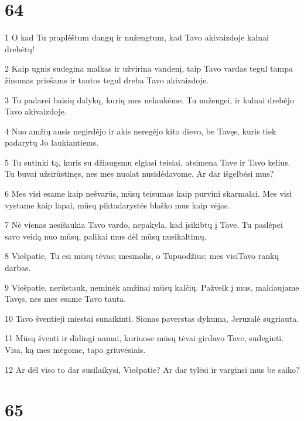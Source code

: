\chapter{64}


\par 1 O kad Tu praplėštum dangų ir nužengtum, kad Tavo akivaizdoje kalnai drebėtų! 
\par 2 Kaip ugnis sudegina malkas ir užvirina vandenį, taip Tavo vardas tegul tampa žinomas priešams ir tautos tegul dreba Tavo akivaizdoje. 
\par 3 Tu padarei baisių dalykų, kurių mes nelaukėme. Tu nužengei, ir kalnai drebėjo Tavo akivaizdoje. 
\par 4 Nuo amžių ausis negirdėjo ir akis neregėjo kito dievo, be Tavęs, kuris tiek padarytų Jo laukiantiems. 
\par 5 Tu sutinki tą, kuris su džiaugsmu elgiasi teisiai, atsimena Tave ir Tavo kelius. Tu buvai užsirūstinęs, nes mes nuolat nusidėdavome. Ar dar išgelbėsi mus? 
\par 6 Mes visi esame kaip nešvarūs, mūsų teisumas kaip purvini skarmalai. Mes visi vystame kaip lapai, mūsų piktadarystės blaško mus kaip vėjas. 
\par 7 Nė vienas nesišaukia Tavo vardo, nepakyla, kad įsikibtų į Tave. Tu paslėpei savo veidą nuo mūsų, palikai mus dėl mūsų nusikaltimų. 
\par 8 Viešpatie, Tu esi mūsų tėvas; mes­molis, o Tu­puodžius; mes visi­Tavo rankų darbas. 
\par 9 Viešpatie, nerūstauk, neminėk amžinai mūsų kalčių. Pažvelk į mus, maldaujame Tavęs, nes mes esame Tavo tauta. 
\par 10 Tavo šventieji miestai sunaikinti. Sionas paverstas dykuma, Jeruzalė sugriauta. 
\par 11 Mūsų šventi ir didingi namai, kuriuose mūsų tėvai girdavo Tave, sudeginti. Visa, ką mes mėgome, tapo griuvėsiais. 
\par 12 Ar dėl viso to dar susilaikysi, Viešpatie? Ar dar tylėsi ir varginsi mus be saiko?



\chapter{65}


